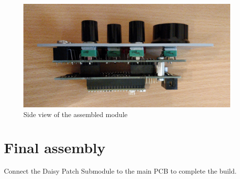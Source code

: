 \documentclass[10pt,a4paper,twocolumn]{article}
\begin{document}
\begin{figure}[p]
  \centering
  \includegraphics[width=\linewidth]{p11.jpg}
  \caption{Side view of the assembled module}
\end{figure}

\section{Final assembly}

Connect the Daisy Patch Submodule to the main PCB to complete the build.
\end{document}
